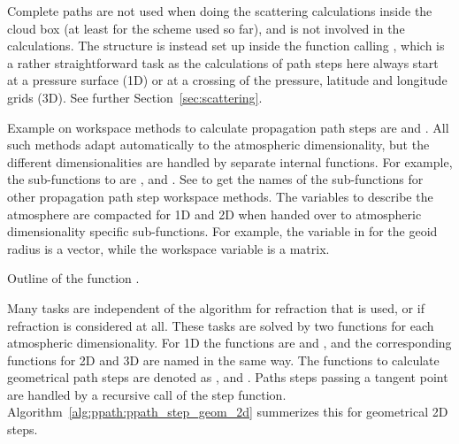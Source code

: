 
Complete paths are not used when doing the scattering calculations
inside the cloud box (at least for the scheme used so far), and
 is not involved in the calculations. The
structure  is instead set up inside the function
calling , which is a rather
straightforward task as the calculations of path steps here always
start at a pressure surface (1D) or at a crossing of the pressure,
latitude and longitude grids (3D). See further
Section~\ref{sec:scattering}.



Example on workspace methods to calculate propagation path steps are
 and
. All such methods adapt
automatically to the atmospheric dimensionality, but the different
dimensionalities are handled by separate internal functions. For
example, the sub-functions to  are
, 
and . See  to
get the names of the sub-functions for other propagation path step
workspace methods. The variables to describe the atmosphere are
compacted for 1D and 2D when handed over to atmospheric dimensionality
specific sub-functions. For example, the variable in
 for the geoid radius is a vector,
while the workspace variable is a matrix.

\begin{algorithm}[!t]
 \begin{algorithmic}
  \ENDIF
  \ENDIF
 \end{algorithmic}
 \caption{Outline of the function .}
 \label{alg:ppath:ppath_step_geom_2d}
\end{algorithm}

Many tasks are independent of the algorithm for refraction that is
used, or if refraction is considered at all. These tasks are solved by
two functions for each atmospheric dimensionality. For 1D the
functions are  and
, and the corresponding functions for 2D and
3D are named in the same way. The functions to calculate geometrical
path steps are denoted as ,
 and . Paths
steps passing a tangent point are handled by a recursive call of the
step function. Algorithm~\ref{alg:ppath:ppath_step_geom_2d} summerizes
this for geometrical 2D steps.


